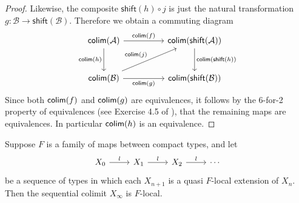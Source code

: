 \begin{proof}
Likewise, the composite $\mathsf{shift}(h) \circ j$ is just the natural transformation $g:\mathcal{B}\to \mathsf{shift}(\mathcal{B})$. Therefore we obtain a commuting diagram
\begin{equation*}
\begin{tikzcd}[column sep=huge,row sep=large]
\mathsf{colim}(\mathcal{A}) \arrow[d,swap,"\mathsf{colim}(h)"] \arrow[r,"\mathsf{colim}(f)"] & \mathsf{colim}(\mathsf{shift}(\mathcal{A})) \arrow[d,"\mathsf{colim}(\mathsf{shift}(h))"] \\
\mathsf{colim}(\mathcal{B}) \arrow[r,swap,"\mathsf{colim}(g)"] \arrow[ur,"\mathsf{colim}(j)"] & \mathsf{colim}(\mathsf{shift}(\mathcal{B}))
\end{tikzcd}
\end{equation*}
Since both $\mathsf{colim}(f)$ and $\mathsf{colim}(g)$ are equivalences, it follows by the 6-for-2 property of equivalences (see Exercise 4.5 of \cite{hottbook}), that the remaining maps are equivalences. In particular $\mathsf{colim}(h)$ is an equivalence. 
\end{proof}

\begin{prp}\label{prp:colim_local}
Suppose $F$ is a family of maps between compact types, and let
\begin{equation*}
\begin{tikzcd}
X_0 \arrow[r,"l"] & X_1 \arrow[r,"l"] & X_2 \arrow[r,"l"] & \cdots
\end{tikzcd}
\end{equation*}
be a sequence of types in which each $X_{n+1}$ is a quasi $F$-local extension of $X_n$. Then the sequential colimit $X_\infty$ is $F$-local.
\end{prp}

